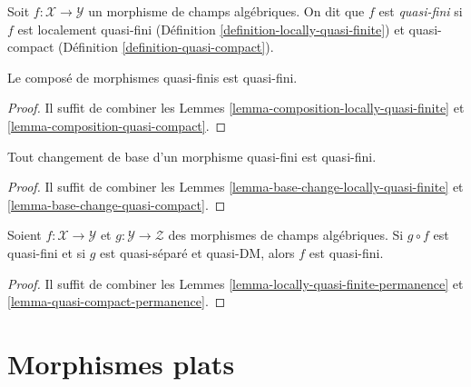 \begin{definition}
\label{definition-quasi-finite}
\begin{reference}
\cite{rydh_approx}
\end{reference}
Soit $f : \mathcal{X} \to \mathcal{Y}$ un morphisme de champs algébriques.
On dit que $f$ est {\it quasi-fini} si $f$ est localement quasi-fini
(Définition \ref{definition-locally-quasi-finite})
et quasi-compact (Définition \ref{definition-quasi-compact}).
\end{definition}

\begin{lemma}
\label{lemma-composition-quasi-finite}
Le composé de morphismes quasi-finis est quasi-fini.
\end{lemma}

\begin{proof}
Il suffit de combiner les
Lemmes \ref{lemma-composition-locally-quasi-finite} et
\ref{lemma-composition-quasi-compact}.
\end{proof}

\begin{lemma}
\label{lemma-base-change-quasi-finite}
Tout changement de base d'un morphisme quasi-fini est quasi-fini.
\end{lemma}

\begin{proof}
Il suffit de combiner les
Lemmes \ref{lemma-base-change-locally-quasi-finite} et
\ref{lemma-base-change-quasi-compact}.
\end{proof}

\begin{lemma}
\label{lemma-quasi-finite-permanence}
Soient $f : \mathcal{X} \to \mathcal{Y}$ et
$g : \mathcal{Y} \to \mathcal{Z}$ des morphismes de champs algébriques.
Si $g \circ f$ est quasi-fini et si $g$ est quasi-séparé et quasi-DM,
alors $f$ est quasi-fini.
\end{lemma}

\begin{proof}
Il suffit de combiner les
Lemmes \ref{lemma-locally-quasi-finite-permanence} et
\ref{lemma-quasi-compact-permanence}.
\end{proof}












\section{Morphismes plats}
\label{section-flat}

